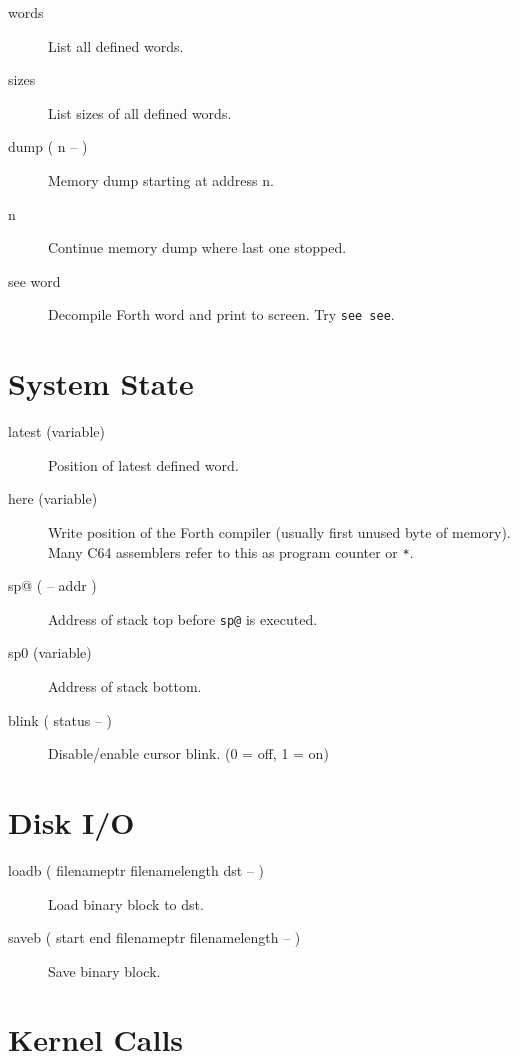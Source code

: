 \begin{description}
\item[words] List all defined words.
\item[sizes] List sizes of all defined words.
\item[dump ( n -- )] Memory dump starting at address n.
\item[n] Continue memory dump where last one stopped.
\item[see word] Decompile Forth word and print to screen. Try \texttt{see see}.
\end{description}


\section{System State}

\begin{description}

\item[latest (variable)] Position of latest defined word.

\item[here (variable)] Write position of the Forth compiler (usually first unused byte of memory). Many C64 assemblers refer to this as program counter or \texttt{*}.

\item[sp@ ( -- addr )] Address of stack top before \texttt{sp@} is executed.
\item[sp0 (variable)] Address of stack bottom.
\item[blink ( status -- )] Disable/enable cursor blink. (0 = off, 1 = on)

\end{description}


\section{Disk I/O}

\begin{description}
\item[loadb ( filenameptr filenamelength dst -- )] Load binary block to dst.
\item[saveb ( start end filenameptr filenamelength -- )] Save binary block.
\end{description}


\section{Kernel Calls}


